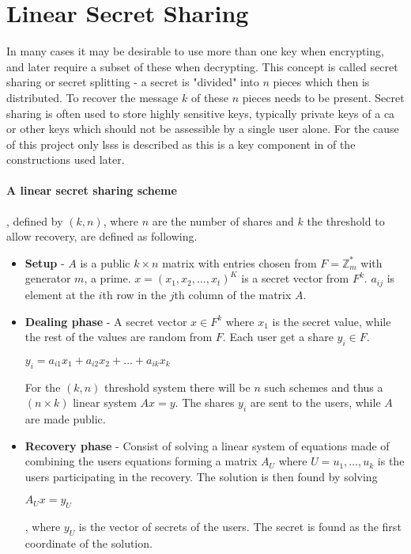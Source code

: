 \section{Linear Secret Sharing}\label{subsec:lsss}
In many cases it may be desirable to use more than one key when encrypting, and later require a subset of these when decrypting. This concept is called secret sharing or secret splitting - a secret is "divided" into $n$ pieces which then is distributed. To recover the message $k$ of these $n$ pieces needs to be present. Secret sharing is often used to store highly sensitive keys, typically private keys of a \gls{ca} or other keys which should not be assessible by a single user alone. For the cause of this project only \gls{lsss} is described as this is a key component in of the constructions used later. \paragraph{A linear secret sharing scheme}\cite{lsss}, defined by $(k,n)$, where $n$ are the number of shares and $k$ the threshold to allow recovery, are defined as following.\\
\begin{itemize}
\item \textbf{Setup} -  $A$ is a public $k\times n$ matrix with entries chosen from $F = \mathbb{Z}_m^*$ with generator $m$, a prime. $x=(x_1,x_2,\dots,x_t)^K$ is a secret vector from $F^k$. $a_{ij}$ is element at the $i$th row in the $j$th column of the matrix $A$.
\item \textbf{Dealing phase} - A secret vector $x \in F^k$ where $x_1$ is the secret value, while the rest of the values are random from $F$. Each user get a share $y_i \in F$.
\centerline{$y_i = a_{i1}x_1 + a_{i2}x_2 + \dots + a_{ik}x_k$}
For the $(k,n)$ threshold system there will be $n$ such schemes and thus a $(n\times k)$ linear system $Ax=y$.
The shares $y_i$ are sent to the users, while $A$ are made public.
\item \textbf{Recovery phase} - Consist of solving a linear system of equations made of combining the users equations forming a matrix $A_U$ where $U = {u_1, \dots, u_k}$ is the users participating in the recovery. The solution is then found by solving 
\centerline{$A_Ux=y_U$}, where $y_U$ is the vector of secrets of the users. The secret is found as the first coordinate of the solution.
\end{itemize}

